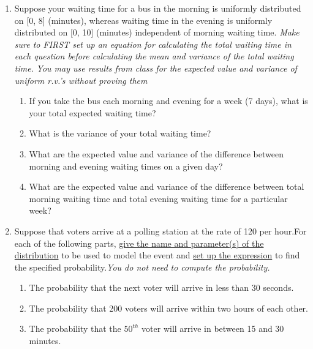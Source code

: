 \documentclass[12pt]{article}
\begin{document}
\begin{enumerate}
%
\item \label{Ch29UnifWaitingTime} Suppose your waiting time for a bus in the morning is uniformly distributed on [0, 8] (minutes), whereas waiting time in the evening is uniformly distributed on [0, 10] (minutes) independent of morning waiting time. \newline
\emph{Make sure to FIRST set up an equation for calculating the total waiting time in each question before calculating the mean and variance of the total waiting time.} \newline
\emph{You may use results from class for the expected value and variance of uniform r.v.'s without proving them}
	\begin{enumerate}
	\item If you take the bus each morning and evening for a week (7 days), what is your total expected waiting time? 
	\item What is the variance of your total waiting time?   
	\item What are the expected value and variance of the difference between morning and evening waiting times on a given day? 
	\item What are the expected value and variance of the difference between total morning waiting time and total evening waiting time for a particular week?
	\end{enumerate}




\item  \label{Ch33PoissonProcess} Suppose that voters arrive at a polling station at the rate
of 120 per hour.\newline For each of the following parts, \underline{give the
name and parameter(s) of the distribution} to be used to model the event and \underline{set up
the expression} to find the specified probability.\newline\emph{You do not
need to compute the probability.}

	\begin{enumerate}
	\item The probability that the next voter will arrive in less than 30 seconds. 
	\item The probability that 200 voters will arrive within two hours of each other.
	\item The probability that the $50^{th}$ voter will arrive in between 15 and 30 minutes.
	\end{enumerate}



\end{enumerate}
\end{document}
